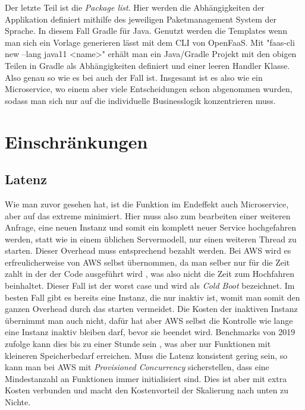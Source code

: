 \documentclass[12pt, a4paper]{article}
\begin{document}
\newline
Der letzte Teil ist die \emph{Package list}.
Hier werden die Abhängigkeiten der Applikation definiert mithilfe des jeweiligen Paketmanagement System der Sprache.
In diesem Fall Gradle für Java.
\newline
Genutzt werden die Templates wenn man sich ein Vorlage generieren lässt mit dem CLI von OpenFaaS.
Mit "faas-cli new --lang java11 <name>" erhält man ein Java/Gradle Projekt mit den obigen Teilen in Gradle als Abhängigkeiten definiert und einer leeren Handler Klasse.
Also genau so wie es bei  auch der Fall ist.
\newline
Insgesamt ist es also wie ein Microservice, wo einem aber viele Entscheidungen schon abgenommen wurden, sodass man sich nur auf die individuelle Businesslogik konzentrieren muss.

\section{Einschränkungen}
\subsection{Latenz}
Wie man zuvor gesehen hat, ist die Funktion im Endeffekt auch Microservice, aber auf das extreme minimiert.
Hier muss also zum bearbeiten einer weiteren Anfrage, eine neuen Instanz und somit ein komplett neuer Service hochgefahren werden, statt wie in einem üblichen Servermodell, nur einen weiteren Thread zu starten.
\newline
Dieser Overhead muss entsprechend bezahlt werden.
Bei AWS wird es erfreulicherweise von AWS selbst übernommen, da man selber nur für die Zeit zahlt in der der Code ausgeführt wird \cite{aws_lambda_pricing}, was also nicht die Zeit zum Hochfahren beinhaltet.
Dieser Fall ist der worst case und wird als \emph{Cold Boot} bezeichnet.
Im besten Fall gibt es bereits eine Instanz, die nur inaktiv ist, womit man somit den ganzen Overhead durch das starten vermeidet.
Die Kosten der inaktiven Instanz übernimmt man auch nicht, dafür hat aber AWS selbst die Kontrolle wie lange eine Instanz inaktiv bleiben darf, bevor sie beendet wird.
Benchmarks von 2019 zufolge kann dies bis zu einer Stunde sein \cite{aws_lambda_idle_timeout}, was aber nur Funktionen mit kleineren Speicherbedarf erreichen.
\newline
Muss die Latenz konsistent gering sein, so kann man bei AWS mit \emph{Provisioned Concurrency} sicherstellen, dass eine Mindestanzahl an Funktionen immer initialisiert sind\cite{aws_lambda_provisioned_concurrency}.
Dies ist aber mit extra Kosten verbunden und macht den Kostenvorteil der Skalierung nach unten zu Nichte.
\end{document}
